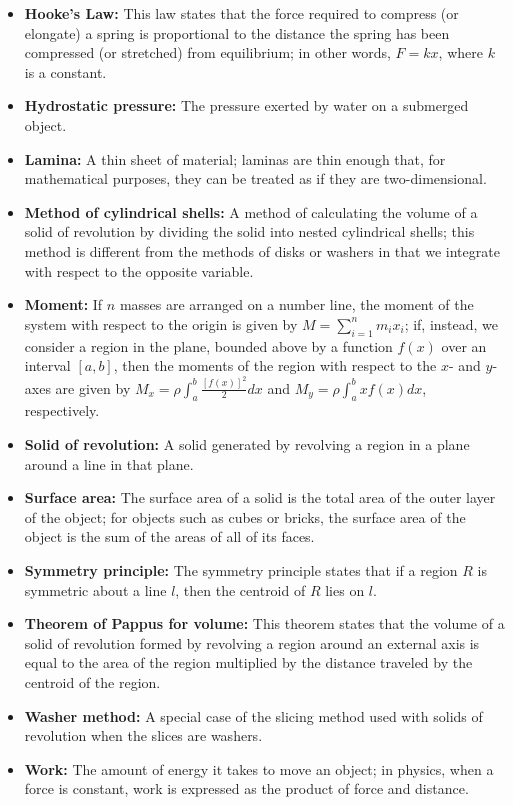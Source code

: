 \documentclass{report}
\begin{document}
\begin{itemize}
        \item \textbf{Hooke's Law:} This law states that the force required to compress (or elongate) a spring is proportional to the distance the spring has been compressed (or stretched) from equilibrium; in other words, \(F = kx\), where \(k\) is a constant.
        \item \textbf{Hydrostatic pressure:} The pressure exerted by water on a submerged object.
        \item \textbf{Lamina:} A thin sheet of material; laminas are thin enough that, for mathematical purposes, they can be treated as if they are two-dimensional.
        \item \textbf{Method of cylindrical shells:} A method of calculating the volume of a solid of revolution by dividing the solid into nested cylindrical shells; this method is different from the methods of disks or washers in that we integrate with respect to the opposite variable.
        \item \textbf{Moment:} If \(n\) masses are arranged on a number line, the moment of the system with respect to the origin is given by \(M = \sum_{i=1}^{n} m_i x_i\); if, instead, we consider a region in the plane, bounded above by a function \(f(x)\) over an interval \([a, b]\), then the moments of the region with respect to the \(x\)- and \(y\)-axes are given by \(M_x = \rho \int_{a}^{b} \frac{[f(x)]^2}{2} dx\) and \(M_y = \rho \int_{a}^{b} x f(x) dx\), respectively.
        \item \textbf{Solid of revolution:} A solid generated by revolving a region in a plane around a line in that plane.
        \item \textbf{Surface area:} The surface area of a solid is the total area of the outer layer of the object; for objects such as cubes or bricks, the surface area of the object is the sum of the areas of all of its faces.
        \item \textbf{Symmetry principle:} The symmetry principle states that if a region \(R\) is symmetric about a line \(l\), then the centroid of \(R\) lies on \(l\).
        \item \textbf{Theorem of Pappus for volume:} This theorem states that the volume of a solid of revolution formed by revolving a region around an external axis is equal to the area of the region multiplied by the distance traveled by the centroid of the region.
        \item \textbf{Washer method:} A special case of the slicing method used with solids of revolution when the slices are washers.
        \item \textbf{Work:} The amount of energy it takes to move an object; in physics, when a force is constant, work is expressed as the product of force and distance.
    \end{itemize}
\end{document}
